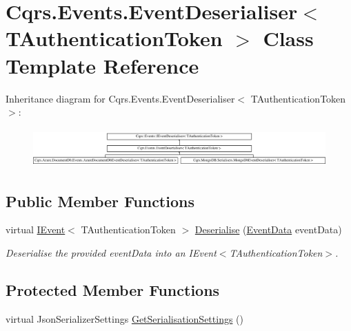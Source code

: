 \hypertarget{classCqrs_1_1Events_1_1EventDeserialiser}{}\section{Cqrs.\+Events.\+Event\+Deserialiser$<$ T\+Authentication\+Token $>$ Class Template Reference}
\label{classCqrs_1_1Events_1_1EventDeserialiser}
Inheritance diagram for Cqrs.\+Events.\+Event\+Deserialiser$<$ T\+Authentication\+Token $>$\+:\begin{figure}[H]
\begin{center}
\leavevmode
\includegraphics[height=1.508079cm]{classCqrs_1_1Events_1_1EventDeserialiser}
\end{center}
\end{figure}
\subsection*{Public Member Functions}
\begin{DoxyCompactItemize}
\item 
virtual \hyperlink{interfaceCqrs_1_1Events_1_1IEvent}{I\+Event}$<$ T\+Authentication\+Token $>$ \hyperlink{classCqrs_1_1Events_1_1EventDeserialiser_a193feac1d58446f0a7447d8ba04179fc_a193feac1d58446f0a7447d8ba04179fc}{Deserialise} (\hyperlink{classCqrs_1_1Events_1_1EventData}{Event\+Data} event\+Data)
\begin{DoxyCompactList}\small\item\em Deserialise the provided {\itshape event\+Data}  into an I\+Event$<$\+T\+Authentication\+Token$>$. \end{DoxyCompactList}\end{DoxyCompactItemize}
\subsection*{Protected Member Functions}
\begin{DoxyCompactItemize}
\item 
virtual Json\+Serializer\+Settings \hyperlink{classCqrs_1_1Events_1_1EventDeserialiser_a3f767a1b793ea47bcafd9c64be47619e_a3f767a1b793ea47bcafd9c64be47619e}{Get\+Serialisation\+Settings} ()
\end{DoxyCompactItemize}
